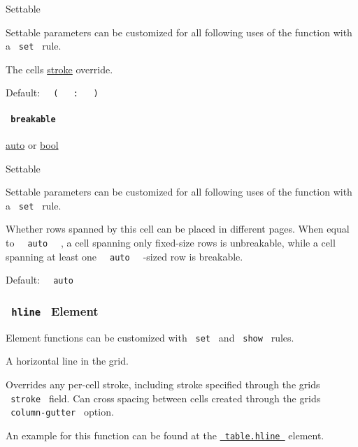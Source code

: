 {{ Settable }}

\label{definitions-cell-stroke-settable-tooltip}
Settable parameters can be customized for all following uses of the
function with a \texttt{\ set\ } rule.

The cell\textquotesingle s
\href{/docs/reference/layout/grid/\#parameters-stroke}{stroke} override.

Default:
\texttt{\ }{\texttt{\ (\ }}\texttt{\ }{\texttt{\ :\ }}\texttt{\ }{\texttt{\ )\ }}\texttt{\ }

\paragraph{\texorpdfstring{\texttt{\ breakable\ }}{ breakable }}\label{definitions-cell-breakable}

\href{/docs/reference/foundations/auto/}{auto} {or}
\href{/docs/reference/foundations/bool/}{bool}

{{ Settable }}

\label{definitions-cell-breakable-settable-tooltip}
Settable parameters can be customized for all following uses of the
function with a \texttt{\ set\ } rule.

Whether rows spanned by this cell can be placed in different pages. When
equal to \texttt{\ }{\texttt{\ auto\ }}\texttt{\ } , a cell spanning
only fixed-size rows is unbreakable, while a cell spanning at least one
\texttt{\ }{\texttt{\ auto\ }}\texttt{\ } -sized row is breakable.

Default: \texttt{\ }{\texttt{\ auto\ }}\texttt{\ }

\subsubsection{\texorpdfstring{\texttt{\ hline\ } {{ Element
}}}{ hline   Element }}\label{definitions-hline}

\label{definitions-hline-element-tooltip}
Element functions can be customized with \texttt{\ set\ } and
\texttt{\ show\ } rules.

A horizontal line in the grid.

Overrides any per-cell stroke, including stroke specified through the
grid\textquotesingle s \texttt{\ stroke\ } field. Can cross spacing
between cells created through the grid\textquotesingle s
\texttt{\ column-gutter\ } option.

An example for this function can be found at the
\href{/docs/reference/model/table/\#definitions-hline}{\texttt{\ table.hline\ }}
element.

